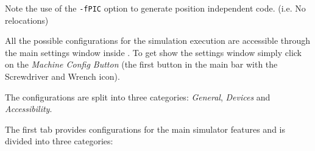 Note the use of the \texttt{-fPIC} option to generate position independent code. (i.e. No relocations)


All the possible configurations for the simulation execution are accessible through the main settings window inside \uarm{}.
To get show the settings window simply click on the \emph{Machine Config Button} (the first button in the main bar with the Screwdriver and Wrench icon).

The configurations are split into three categories: \emph{General}, \emph{Devices} and \emph{Accessibility}.


The first tab provides configurations for the main simulator features and is divided into three categories: 
